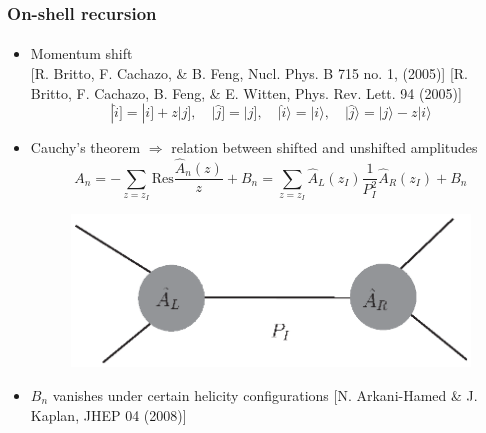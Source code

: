 \documentclass[english]{beamer}
\newcommand{\res}{\mathrm{Res}}
\begin{document}
\begin{frame}[shrink=20]
\frametitle{On-shell recursion}
\framesubtitle{
}
\begin{itemize}
\item<1-> Momentum shift
\\
\tiny\color{blue}
[R. Britto, F. Cachazo, \& B. Feng, Nucl. Phys. B 715 no. 1, (2005)] 
[R. Britto, F. Cachazo, B. Feng, \& E. Witten, Phys. Rev. Lett. 94
(2005)]
\color{black}\normalsize
\begin{equation*}
|\hat{i}] = |i] + z |j], \quad |\hat{j}] = |j], \quad|\hat{i}\rangle = |i\rangle, \quad |\hat{j}\rangle = |j\rangle - z|i\rangle
\end{equation*}  

\item<2-> Cauchy's theorem $\Rightarrow$ relation between shifted and unshifted amplitudes
\begin{equation*}
A_n = - \sum_{z = z_I}\res\frac{\hat{A}_n(z)}{z} + B_n
=\sum_{z = z_I} \hat{A}_L(z_I)\frac{1}{P_I^2}\hat{A}_R(z_I) + B_n
\end{equation*} 
\begin{figure}[h]
  \centering
  \includegraphics[width=0.5\linewidth]{bcfw.eps}
\end{figure}

\item<3-> $B_n$ vanishes under certain helicity configurations
\tiny\color{blue}[N. Arkani-Hamed \& J. Kaplan, JHEP 04 (2008)]
\color{black}\normalsize

\end{itemize}

\end{frame}
\end{document}

